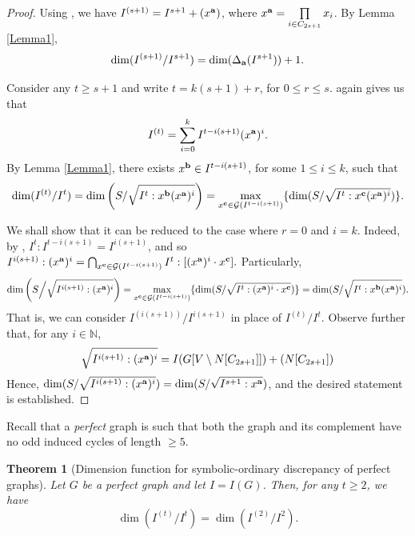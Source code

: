 \documentclass[12pt]{amsart}
\numberwithin{equation}{section}
\newtheorem{theorem}{Theorem}[section]
\theoremstyle{definition}
\theoremstyle{definition}
\newcommand{\NN}{{\mathbb N}}
\def\a{{\bold a}}
\def\b{{\bold b}}
\def\c{{\bold c}}
\def\G{\mathcal{G}}
\begin{document}
\begin{proof} Using \cite[Theorem 3.4]{GHOS}, we have $I^{(s+1)}=I^{s+1}+(x^\a)$, where $x^\a=\prod\limits_{i\in C_{2s+1}}x_i$. By Lemma \ref{Lemma1},
	$$\dim(I^{(s+1)}/I^{s+1})=\dim(\Delta_\a(I^{s+1}))+1.$$
	
Consider any $t\ge s+1$ and write $t=k(s+1)+r$, for $0\le r\le s$. \cite[Theorem 3.4]{GHOS} again gives us that
	$$I^{(t)}=\sum_{i=0}^{k}I^{t-i(s+1)}(x^\a)^i.$$
	By Lemma \ref{Lemma1}, there exists $x^\b \in I^{t-i(s+1)}$, for some $1 \le i \le k$, such that
	$$\dim(I^{(t)}/I^{t})=\dim\left(S/\sqrt{I^t:x^\b(x^\a)^i}\right) = \max\limits_{x^\c \in \G(I^{t-i(s+1)})} \{\dim (S/\sqrt{I^t: x^\c(x^\a)^i})\}.$$
	
We shall show that it can be reduced to the case where $r=0$ and $i=k$. Indeed, by \cite[Lemma 2.12]{MV2012}, $I^{t}:I^{t-i(s+1)}=I^{i(s+1)}$, and so
	$I^{i(s+1)}:(x^\a)^i=\bigcap_{x^\c\in \G(I^{t-i(s+1)})} I^{t}:[(x^\a)^i\cdot x^\c].$
	Particularly, 
	$$\dim\left(S\Big/\sqrt{I^{i(s+1)}:(x^\a)^i}\right) = \max\limits_{x^\c \in \G(I^{t-i(s+1)})} \{\dim (S/\sqrt{I^t: (x^\a)^i \cdot x^\c})\} = \dim(S/\sqrt{I^t:x^\b(x^\a)^i}).$$ 
That is, we can consider $I^{(i(s+1))}/I^{i(s+1)}$ in place of $I^{(t)}/I^t$. Observe further that, for any $i \in \NN$,
	$$\sqrt{I^{i(s+1)}:(x^\a)^i}=I(G[V\setminus N[C_{2s+1}]])+(N[C_{2s+1}])$$
Hence, $\dim(S/\sqrt{I^{i(s+1)}:(x^\a)^i})=\dim(S/\sqrt{I^{s+1}:x^\a})$, and the desired statement is established.
\end{proof}

Recall that a \emph{perfect} graph is such that both the graph and its complement have no odd induced cycles of length $\ge 5$.

\begin{theorem}[Dimension function for symbolic-ordinary discrepancy of perfect graphs] \label{thm.perfect}
	Let $G$ be a perfect graph and let $I = I(G)$. Then, for any $t \ge 2$, we have
$$\dim(I^{(t)}/I^{t}) = \dim(I^{(2)}/I^{2}).$$
\end{theorem}
\end{document}
